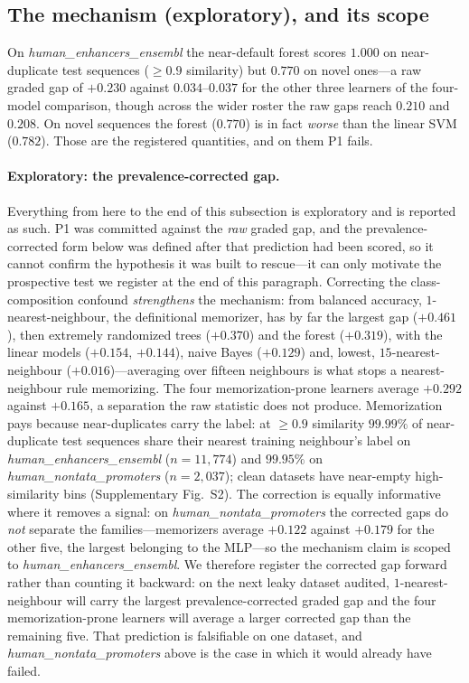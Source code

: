 \documentclass[webpdf,modern,large,namedate]{oup-authoring-template}%
\begin{document}
\subsection{The mechanism (exploratory), and its scope}\label{sec:r-mech}
On \textit{human\_enhancers\_ensembl} the near-default forest scores $1.000$ on near-duplicate test sequences ($\ge0.9$ similarity) but $0.770$ on novel ones---a raw graded gap of $+0.230$ against $0.034$--$0.037$ for the other three learners of the four-model comparison, though across the wider roster the raw gaps reach $0.210$ and $0.208$. On novel sequences the forest ($0.770$) is in fact \emph{worse} than the linear SVM ($0.782$). Those are the registered quantities, and on them P1 fails.

\paragraph{Exploratory: the prevalence-corrected gap.} Everything from here to the end of this subsection is exploratory and is reported as such. P1 was committed against the \emph{raw} graded gap, and the prevalence-corrected form below was defined after that prediction had been scored, so it cannot confirm the hypothesis it was built to rescue---it can only motivate the prospective test we register at the end of this paragraph. Correcting the class-composition confound \emph{strengthens} the mechanism: from balanced accuracy, $1$-nearest-neighbour, the definitional memorizer, has by far the largest gap ($+0.461$), then extremely randomized trees ($+0.370$) and the forest ($+0.319$), with the linear models ($+0.154$, $+0.144$), naive Bayes ($+0.129$) and, lowest, $15$-nearest-neighbour ($+0.016$)---averaging over fifteen neighbours is what stops a nearest-neighbour rule memorizing. The four memorization-prone learners average $+0.292$ against $+0.165$, a separation the raw statistic does not produce. Memorization pays because near-duplicates carry the label: at $\ge0.9$ similarity $99.99\%$ of near-duplicate test sequences share their nearest training neighbour's label on \textit{human\_enhancers\_ensembl} ($n=11{,}774$) and $99.95\%$ on \textit{human\_nontata\_promoters} ($n=2{,}037$); clean datasets have near-empty high-similarity bins (Supplementary Fig.~S2). The correction is equally informative where it removes a signal: on \textit{human\_nontata\_promoters} the corrected gaps do \emph{not} separate the families---memorizers average $+0.122$ against $+0.179$ for the other five, the largest belonging to the MLP---so the mechanism claim is scoped to \textit{human\_enhancers\_ensembl}. We therefore register the corrected gap forward rather than counting it backward: on the next leaky dataset audited, $1$-nearest-neighbour will carry the largest prevalence-corrected graded gap and the four memorization-prone learners will average a larger corrected gap than the remaining five. That prediction is falsifiable on one dataset, and \textit{human\_nontata\_promoters} above is the case in which it would already have failed.
\end{document}
